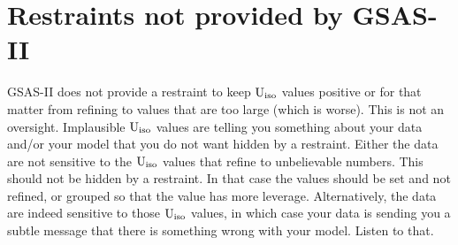 \section{Restraints not provided by GSAS-II}
GSAS-II does not provide a restraint to keep $\rm U_{iso}$ values positive or for that matter from refining to values that are too large (which is worse). This is not an oversight. Implausible $\rm U_{iso}$ values are telling you something about your data and/or your model that you do not want hidden by a restraint. Either the data are not sensitive to the $\rm U_{iso}$ values that refine to unbelievable numbers. This should not be hidden by a restraint. In that case the values should be set and not refined, or grouped so that the value has more leverage. Alternatively, the data are indeed sensitive to those $\rm U_{iso}$ values, in which case your data is sending you a subtle message that there is something wrong with your model. Listen to that. 
